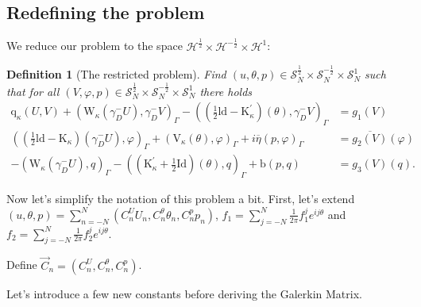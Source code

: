 \documentclass[10pt,journal,compsoc, onecolumn]{IEEEtran}
\newtheorem{definition}[theorem]{Definition}
\begin{document}
\subsection{Redefining the problem}
We reduce our problem to the space \(\mathcal{H}^{\frac{1}{2}} \times \mathcal{H}^{-\frac{1}{2}} \times \mathcal{H}^{1}\):
\begin{definition}[The restricted problem]
    Find \((u, \theta, p) \in  \mathcal{S}_N^{\frac{1}{2}} \times \mathcal{S}_N^{-\frac{1}{2}} \times \mathcal{S}_N^{1}\) 
    such that for all $(V, \varphi, p) \in \mathcal{S}_N^{\frac{1}{2}} \times \mathcal{S}_N^{-\frac{1}{2}} \times \mathcal{S}_N^{1}$ there holds
    $$
    \begin{aligned}
        \mathrm{q}_{\kappa}(U, V)+\left(\mathrm{W}_{\kappa}\left(\gamma_{D}^{-} U\right), \gamma_{D}^{-} V\right)_{\Gamma}-\left((\frac{1}{2} \mathrm{ld}-\mathrm{K}_{\kappa}^{\prime})(\theta), \gamma_{D}^{-} V\right)_{\Gamma} &=g_1(V) \\
        \left((\frac{1}{2} \mathrm{ld}-\mathrm{K}_{\kappa})\left(\gamma_{D}^{-} U\right), \varphi\right)_{\Gamma}+\left(\mathrm{V}_{\kappa}(\theta), \varphi\right)_{\Gamma}+i \overline{\eta}(p, \varphi)_{\Gamma} &=\overline{g_2(V)}(\varphi) \\
        -\left(\mathrm{W}_{\kappa}\left(\gamma_{D}^{-} U\right), q\right)_{\Gamma}-\left((\mathrm{K}_{\kappa}^{\prime}+\frac{1}{2} \mathrm{Id})(\theta), q\right)_{\Gamma}+\mathrm{b}(p, q) &=g_3(V)(q).
    \end{aligned}
    $$
\end{definition}
Now let's simplify the notation of this problem a bit. First, let's extend 
$(u, \theta, p) = \sum\limits_{n = -N}^N (C^U_n U_n, C^\theta_n \theta_n, C^p_n p_n)$, 
$f_1= \sum\limits_{j = -N}^N \frac{1}{2\pi}f_1^j e^{i j \theta}$ and $f_2= \sum\limits_{j = -N}^N \frac{1}{2\pi} f_2^j e^{i j \theta}$.

Define $\vec{C}_n = (C^U_n, C^\theta_n, C^p_n)$.

Let's introduce a few new constants before deriving the Galerkin Matrix. 
\end{document}
